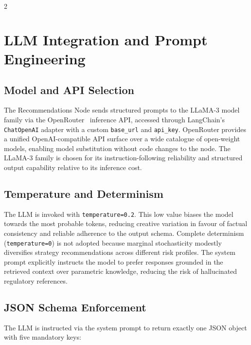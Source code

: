 \documentclass[11pt]{article}
\begin{document}
\begin{multicols}{2}
\section{LLM Integration and Prompt Engineering}

\subsection{Model and API Selection}

The Recommendations Node sends structured prompts to the LLaMA-3 model family
via the OpenRouter~\cite{openrouter2023} inference API, accessed through
LangChain's \texttt{ChatOpenAI} adapter with a custom \texttt{base\_url} and
\texttt{api\_key}. OpenRouter provides a unified OpenAI-compatible API surface
over a wide catalogue of open-weight models, enabling model substitution
without code changes to the node. The LLaMA-3 family is chosen for its
instruction-following reliability and structured output capability relative to
its inference cost.

\subsection{Temperature and Determinism}

The LLM is invoked with \texttt{temperature=0.2}. This low value biases
the model towards the most probable tokens, reducing creative variation in
favour of factual consistency and reliable adherence to the output schema.
Complete determinism (\texttt{temperature=0}) is not adopted because marginal
stochasticity modestly diversifies strategy recommendations across different
risk profiles. The system prompt explicitly instructs the model to prefer
responses grounded in the retrieved context over parametric knowledge, reducing
the risk of hallucinated regulatory references.

\subsection{JSON Schema Enforcement}

The LLM is instructed via the system prompt to return exactly one JSON object
with five mandatory keys:


\end{multicols}
\end{document}
